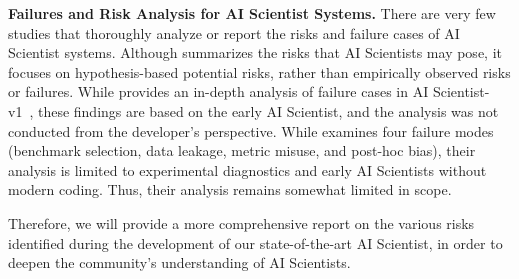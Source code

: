 \textbf{Failures and Risk Analysis for AI Scientist Systems.}
There are very few studies that thoroughly analyze or report the risks and failure cases of AI Scientist systems.
Although \cite{tang2024prioritizing} summarizes the risks that AI Scientists may pose, it focuses on hypothesis-based potential risks, rather than empirically observed risks or failures.
While \cite{beel2025evaluating} provides an in-depth analysis of failure cases in AI Scientist-v1~\citep{lu2024ai}, these findings are based on the early AI Scientist, and the analysis was not conducted from the developer's perspective.
While \cite{luo2025more} examines four failure modes (benchmark selection, data leakage, metric misuse, and post-hoc bias), their analysis is limited to experimental diagnostics and early AI Scientists without modern coding. Thus, their analysis remains somewhat limited in scope.

Therefore, we will provide a more comprehensive report on the various risks identified during the development of our state-of-the-art AI Scientist, in order to deepen the community's understanding of AI Scientists.
